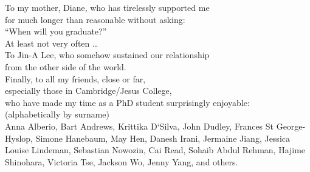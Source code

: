 
\begin{dedication}
To my mother, Diane, who has tirelessly supported me\\
for much longer than reasonable without asking:\\
``When will you graduate?''\\
At least not very often \ldots\\
\vspace{0.33\textheight minus 10ex}
To Jin-A Lee, who somehow sustained our relationship\\
from the other side of the world.\\
\vspace{0.11\textheight minus 10ex}
Finally, to all my friends, close or far,\\
especially those in Cambridge/Jesus College,\\
who have made my time as a PhD student surprisingly enjoyable:\\
\vspace{1em}
{\small(alphabetically by surname)}\\
\vspace{0.5em}
Anna Alberio,
Bart Andrews,
Krittika D`Silva,
John Dudley,
Frances St George-Hyslop,
Simone Hanebaum,
May Hen,
Danesh Irani,
Jermaine Jiang,
Jessica Louise Lindeman,
Sebastian Nowozin,
Cai Read,
Sohaib Abdul Rehman,
Hajime Shinohara,
Victoria Tse,
Jackson Wo,
Jenny Yang,
and others.
\end{dedication}